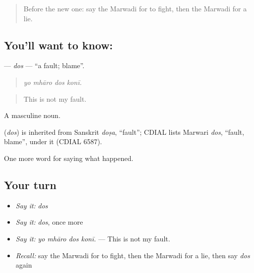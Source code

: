 \label{lesson:MW-C244-dos}



\begin{quote}
Before the new one: say the Marwadi for to fight, then the Marwadi for a lie.
\end{quote}

\subsection*{You'll want to know: }
\textbf{} — \emph{dos} — \textquotedblleft{}a fault; blame\textquotedblright{}.

\begin{quote}
   
\end{quote}

\begin{quote}
\emph{yo mhāro dos konī.}
\end{quote}

\begin{quote}
This is not my fault.
\end{quote}

A masculine noun.

\begin{cousinweb}
\textbf{} (\emph{dos}) is inherited from Sanskrit \emph{doṣa}, \textquotedblleft{}fault\textquotedblright{}; CDIAL lists Marwari \emph{dos}, \textquotedblleft{}fault, blame\textquotedblright{}, under it (CDIAL 6587).
\end{cousinweb}

\begin{grammarlens}[title={What you've built}]
One more word for saying what happened.
\end{grammarlens}

\subsection*{Your turn}
\begin{itemize}
\raggedright
  \item \emph{Say it:} \emph{dos}
  \item \emph{Say it:} \emph{dos}, once more
  \item \emph{Say it:} \emph{yo mhāro dos konī.} — This is not my fault.
  \item \emph{Recall:} say the Marwadi for to fight, then the Marwadi for a lie, then say \emph{dos} again
\end{itemize}

